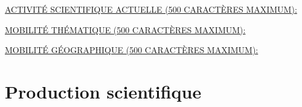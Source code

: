 \documentclass[a4paper,11pt]{article}
\newcommand{\anglaisFrancais}[2]{#2}
\newcommand{\anglaisFrancais}[2]{#1}
\begin{document}
\noindent\underline{\MakeUppercase{\anglaisFrancais{Current scientific activity (maximum 500 characters):}{Activité scientifique actuelle (500 caractères maximum): }}}



\bigskip
\bigskip

\noindent\underline{\MakeUppercase{\anglaisFrancais{Mobility across thematic areas (maximum 500 characters):}{Mobilité thématique (500 caractères maximum): }}}

\bigskip



\bigskip
\bigskip

\noindent\underline{\MakeUppercase{\anglaisFrancais{Geographic mobility (maximum 500 characters):}{Mobilité géographique (500 caractères maximum): }}}

\bigskip




\section{\anglaisFrancais{Publication record}{Production scientifique}}
\end{document}
